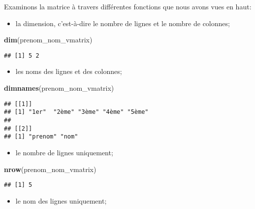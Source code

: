 \documentclass[]{book}
\newenvironment{Shaded}{\begin{snugshade}}{\end{snugshade}}
\newcommand{\KeywordTok}[1]{\textcolor[rgb]{0.13,0.29,0.53}{\textbf{#1}}}
\newcommand{\NormalTok}[1]{#1}
\providecommand{\tightlist}{%
  \setlength{\itemsep}{0pt}\setlength{\parskip}{0pt}}
\begin{document}
Examinons la matrice à travers différentes fonctions que nous avons vues
en haut:

\begin{itemize}
\tightlist
\item
  la dimension, c'est-à-dire le nombre de lignes et le nombre de
  colonnes;
\end{itemize}

\begin{Shaded}
\begin{Highlighting}[]
\KeywordTok{dim}\NormalTok{(prenom_nom_vmatrix)}
\end{Highlighting}
\end{Shaded}

\begin{verbatim}
## [1] 5 2
\end{verbatim}

\begin{itemize}
\tightlist
\item
  les noms des lignes et des colonnes;
\end{itemize}

\begin{Shaded}
\begin{Highlighting}[]
\KeywordTok{dimnames}\NormalTok{(prenom_nom_vmatrix)}
\end{Highlighting}
\end{Shaded}

\begin{verbatim}
## [[1]]
## [1] "1er"  "2ème" "3ème" "4ème" "5ème"
## 
## [[2]]
## [1] "prenom" "nom"
\end{verbatim}

\begin{itemize}
\tightlist
\item
  le nombre de lignes uniquement;
\end{itemize}

\begin{Shaded}
\begin{Highlighting}[]
\KeywordTok{nrow}\NormalTok{(prenom_nom_vmatrix)}
\end{Highlighting}
\end{Shaded}

\begin{verbatim}
## [1] 5
\end{verbatim}

\begin{itemize}
\tightlist
\item
  le nom des lignes uniquement;
\end{itemize}
\end{document}
